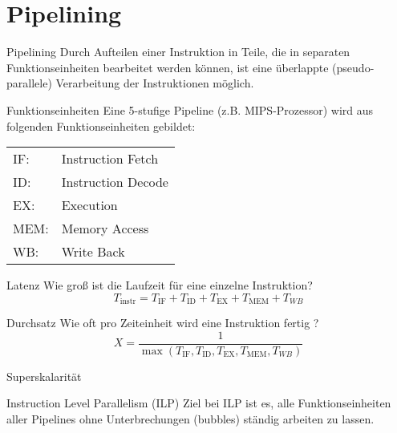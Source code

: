 
\section{Pipelining}

\begin{defi}{Pipelining}
    Durch Aufteilen einer Instruktion in Teile, 
    die in separaten Funktionseinheiten bearbeitet werden können, 
    ist eine überlappte (pseudo-parallele) Verarbeitung der Instruktionen möglich.
\end{defi}

\begin{defi}[Pipelining]{Funktionseinheiten}
    Eine 5-stufige Pipeline (z.B. MIPS-Prozessor) wird aus folgenden Funktionseinheiten gebildet:
    \begin{center}
        \begin{tabular}{ll}
            IF:  & Instruction Fetch  \\
            ID:  & Instruction Decode \\
            EX:  & Execution          \\
            MEM: & Memory Access      \\
            WB:  & Write Back         \\
        \end{tabular}
    \end{center}
\end{defi}

\begin{defi}[Pipelining]{Latenz}
    Wie groß ist die Laufzeit für eine einzelne Instruktion?
    \[T_\text{instr} = T_\text{IF} + T_\text{ID} + T_\text{EX} + T_\text{MEM} + T_{WB}\]
\end{defi}

\begin{defi}[Pipelining]{Durchsatz}
    Wie oft pro Zeiteinheit wird eine Instruktion fertig ?
    \[X = \frac{1}{\max(T_\text{IF}, T_\text{ID}, T_\text{EX}, T_\text{MEM}, T_{WB})}\]
\end{defi}

\begin{defi}{Superskalarität}
    
\end{defi}

\begin{defi}{Instruction Level Parallelism (ILP)}
    Ziel bei ILP ist es, 
    alle Funktionseinheiten aller Pipelines ohne Unterbrechungen (bubbles) ständig arbeiten zu lassen.
\end{defi}

